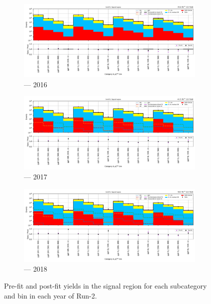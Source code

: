 \begin{figure}[htbp]
    \centering
    \begin{subfigure}[b]{0.9\textwidth}
        \includegraphics[width=\textwidth]{figures/mountain_ranges/2016/ggF/SR_tree_fit_s-abs_values_ggF_cats.pdf}
        \caption{\ggH --- 2016}
    \end{subfigure}

    \begin{subfigure}[b]{0.9\textwidth}
        \includegraphics[width=\textwidth]{figures/mountain_ranges/2017/ggF/SR_tree_fit_s-abs_values_ggF_cats.pdf}
        \caption{\ggH --- 2017}
    \end{subfigure}

    \begin{subfigure}[b]{0.9\textwidth}
        \includegraphics[width=\textwidth]{figures/mountain_ranges/2018/ggF/SR_tree_fit_s-abs_values_ggF_cats.pdf}
        \caption{\ggH --- 2018}
    \end{subfigure}
    \caption[Pre-fit and post-fit yields in the signal region for each \ggH subcategory and \ptmiss bin in each year of Run-2]{Pre-fit and post-fit yields in the signal region for each \ggH subcategory and \ptmiss bin in each year of Run-2.}
    \label{fig:htoinv_mountain_range_ggH_SR}
\end{figure}

